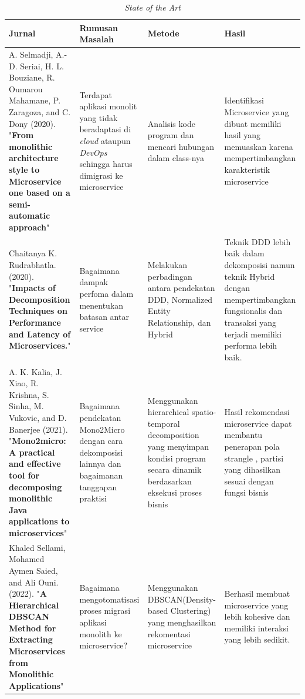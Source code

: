 \begin{small}
	\begin{longtable}{|p{3cm}|p{3.5cm}|p{3cm}|p{3.5cm}|}
		\caption{\textit{State of the Art}}\\
		\hline
		\textbf{Jurnal} & \textbf{Rumusan Masalah} & \textbf{Metode} & \textbf{Hasil}\\
		\endfirsthead

		\hline
		A. Selmadji, A.-D. Seriai, H. L. Bouziane, R. Oumarou Mahamane, P. Zaragoza, and C. Dony   (2020). "\textbf{From monolithic architecture style to Microservice one based on a semi-automatic approach}" \cite{5B1} &
		Terdapat aplikasi monolit yang tidak beradaptasi di \textit{cloud} ataupun \textit{DevOps} sehingga harus dimigrasi ke microservice &
		Analisis kode program dan mencari hubungan dalam class-nya  &
		Identifikasi Microservice yang dibuat memiliki hasil yang memuaskan karena mempertimbangkan karakteristik microservice
		\\

		\hline
		Chaitanya K. Rudrabhatla. (2020). "\textbf{Impacts of Decomposition Techniques on Performance and Latency of Microservices.}"  \cite{6C1} &
		Bagaimana dampak perfoma dalam menentukan batasan antar service  &
		Melakukan perbadingan antara pendekatan DDD, Normalized Entity Relationship, dan Hybrid &
		Teknik DDD lebih baik dalam dekomposisi namun teknik Hybrid dengan mempertimbangkan fungsionalis dan transaksi yang terjadi memiliki performa lebih baik.
		\\

		\hline
		A. K. Kalia, J. Xiao, R. Krishna, S. Sinha, M. Vukovic, and D. Banerjee (2021). "\textbf{Mono2micro: A practical and effective tool for decomposing monolithic Java applications to microservices}" \cite{8EA} &
		Bagaimana pendekatan Mono2Micro dengan cara dekomposisi lainnya dan bagaimanan tanggapan praktisi&
		Menggunakan hierarchical spatio-temporal decomposition  yang menyimpan kondisi program secara dinamik berdasarkan eksekusi proses bisnis  &
		Hasil rekomendasi microservice dapat membantu penerapan pola strangle , partisi yang dihasilkan sesuai dengan fungsi bisnis
		\\
		
		\hline
		Khaled Sellami, Mohamed Aymen Saied, and Ali Ouni. (2022). "\textbf{A Hierarchical
		DBSCAN Method for Extracting Microservices from Monolithic Applications}" \cite{ECD} &
		Bagaimana mengotomatisasi proses migrasi aplikasi monolith ke microservice?  &
	    Menggunakan DBSCAN(Density-based Clustering) yang menghasilkan rekomentasi microservice  &
		Berhasil membuat microservice yang lebih kohesive dan memiliki interaksi yang lebih sedikit. 
		\\
		\hline
	\end{longtable}
\end{small}
